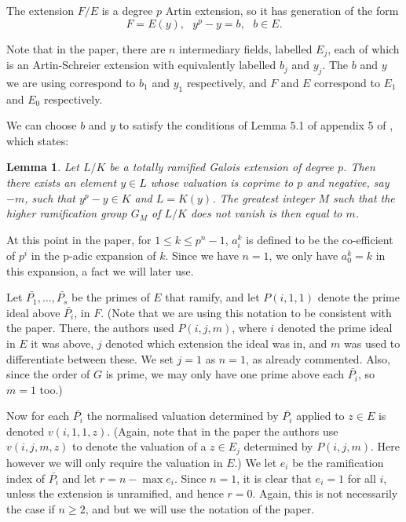 \documentclass[11pt]{article} %
\newtheorem{lem}{Lemma}
\theoremstyle{remark}\newtheorem*{rem}{Remark}
\begin{document}
The extension $F/E$ is a degree $p$ Artin extension, so it has generation of the form 
\[
F=E(y), \mbox{	} y^p-y = b, \mbox{	} b\in E.
\]

Note that in the paper, there are $n$ intermediary fields, labelled $E_j$, each of which is an Artin-Schreier extension with equivalently labelled $b_j$ and $y_j$.
The $b$ and $y$ we are using correspond to $b_1$ and $y_1$ respectively, and $F$ and $E$ correspond to $E_1$ and $E_0$ respectively.


We can choose $b$ and $y$ to satisfy the conditions of Lemma 5.1 of appendix 5 of \cite{quaddiffequi}, which states:\newline


\begin{lem}\label{koeck}
Let $L/K$ be a totally ramified Galois extension of degree $p$.
Then there exists an element $y \in L$ whose valuation is coprime to $p$ and
negative, say $-m$, such that $y^p - y \in K$ and $L = K(y)$. The greatest
integer $M$ such that the higher ramification group $G_M$ of $L/K$ does not vanish
is then equal to $m$.
\end{lem}


At this point in the paper, for $1\leq k \leq p^n-1$, $a_i^k$ is defined to be the co-efficient of $p^i$ in the p-adic expansion of $k$. 
Since we have $n=1$, we only have $a_0^k = k$ in this expansion, a fact we will later use.

Let $\bar{P_1},\dots , \bar{P_s}$ be the primes of $E$ that ramify, and let $P(i,1,1)$ denote the prime ideal above $\bar{P_i}$, in $F$.
(Note that we are using this notation to be consistent with the paper. 
There, the authors used $P(i,j,m)$, where $i$ denoted the prime ideal in $E$ it was above, $j$ denoted which extension the ideal was in, and $m$ was used to differentiate between these.
We set $j=1$ as $n=1$, as already commented.
Also, since the order of $G$ is prime, we may only have one prime above each $\bar{P_i}$, so $m=1$ too.)


Now for each $\bar{P_i}$ the normalised valuation determined by $\bar{P_i}$ applied to $z\in E$ is denoted $v(i,1,1,z)$.
(Again, note that in the paper the authors use $v(i,j,m,z)$ to denote the valuation of a $z\in E_j$ determined by $P(i,j,m).$
Here however we will only require the valuation in $E$.)
We let $e_i$ be the ramification index of $\bar{P_i}$ and let $r=n-\max{e_i}$.
Since $n=1$, it is clear that $e_i=1$ for all $i$, unless the extension is unramified, and hence $r=0$.
Again, this is not necessarily the case if $n\geq 2$, and but we will use the notation of the paper.
\end{document}
